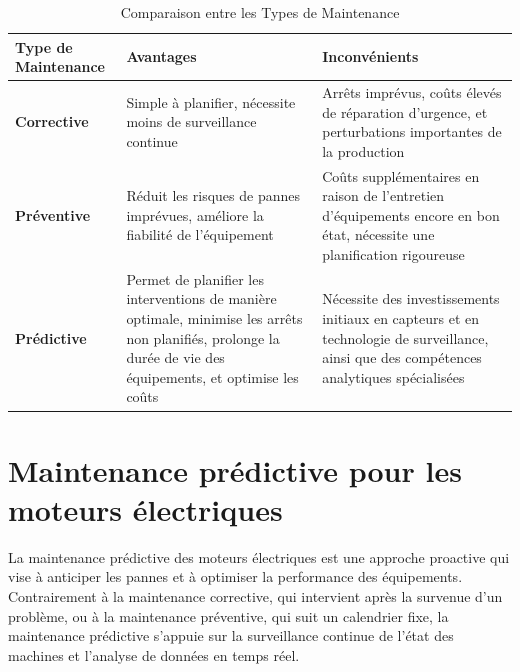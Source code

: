 \begin{table}[h]
	\centering
	\begin{tabular}{|l|p{5cm}|p{5cm}|}
		\hline
		\textbf{Type de Maintenance} & \textbf{Avantages}                                                                                                                                            & \textbf{Inconvénients}                                                                                                                   \\
		\hline
		\textbf{Corrective}          & Simple à planifier, nécessite moins de surveillance continue                                                                                                  & Arrêts imprévus, coûts élevés de réparation d’urgence, et perturbations importantes de la production                                     \\
		\hline
		\textbf{Préventive}          & Réduit les risques de pannes imprévues, améliore la fiabilité de l’équipement                                                                                 & Coûts supplémentaires en raison de l’entretien d’équipements encore en bon état, nécessite une planification rigoureuse                  \\
		\hline
		\textbf{Prédictive}          & Permet de planifier les interventions de manière optimale, minimise les arrêts non planifiés, prolonge la durée de vie des équipements, et optimise les coûts & Nécessite des investissements initiaux en capteurs et en technologie de surveillance, ainsi que des compétences analytiques spécialisées \\
		\hline
	\end{tabular}
	\caption{Comparaison entre les Types de Maintenance}
	\label{tab:comparaison-maintenance}
\end{table}

\section{Maintenance prédictive pour les  moteurs électriques }

La maintenance prédictive des moteurs électriques est une approche proactive
qui vise à anticiper les pannes et à optimiser la performance des équipements.
Contrairement à la maintenance corrective, qui intervient après la survenue
d'un problème, ou à la maintenance préventive, qui suit un calendrier fixe, la
maintenance prédictive s'appuie sur la surveillance continue de l'état des
machines et l'analyse de données en temps réel.

